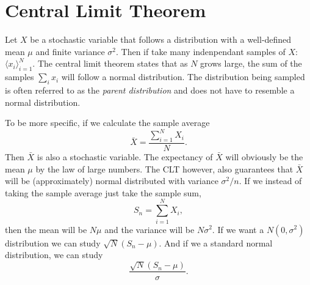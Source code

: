 \documentclass[a4paper, 11pt, notitlepage, english]{article}
\begin{document}
\section*{Central Limit Theorem}

Let $X$ be a stochastic variable that follows a distribution with a well-defined mean $\mu$ and finite variance $\sigma^2$. Then if take many indenpendant samples of $X$: $\langle x_i \rangle_{i=1}^{N}$. The central limit theorem states that as $N$ grows large, the sum of the samples $\sum_i x_i$ will follow a normal distribution. The distribution being sampled is often referred to as the \emph{parent distribution} and does not have to resemble a normal distribution.

To be more specific, if we calculate the sample average
$$\bar{X} = \frac{\sum_{i=1}^N X_i}{N}.$$
Then $\bar{X}$ is also a stochastic variable. The expectancy of $\bar{X}$ will obviously be the mean $\mu$ by the law of large numbers. The CLT however, also guarantees that $\bar{X}$ will be (approximately) normal distributed with variance $\sigma^2/n$. If we instead of taking the sample average just take the sample sum, 
$$S_n = \sum_{i=1}^N X_i,$$
then the mean will be $N\mu$ and the variance will be $N\sigma^2$. If we want a $N(0, \sigma^2)$ distribution we can study $\sqrt{N}(S_n - \mu)$. And if we a standard normal distribution, we can study
$$\frac{\sqrt{N}(S_n - \mu)}{\sigma}.$$



\end{document}
